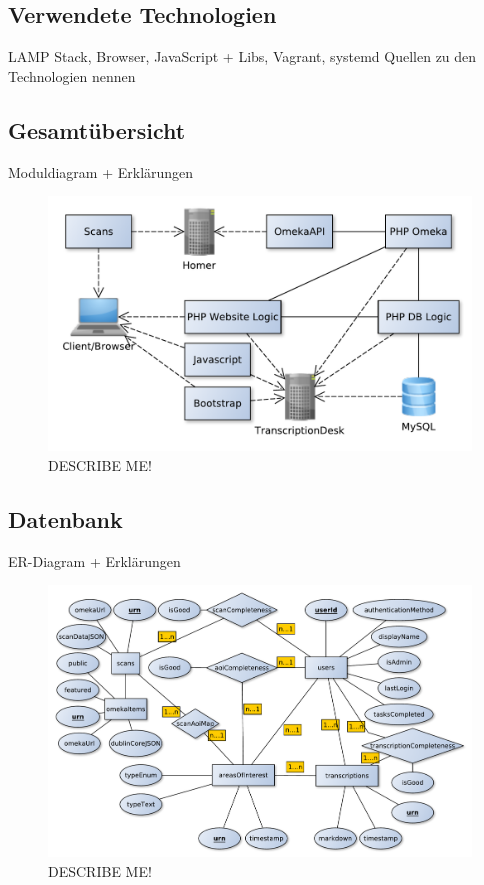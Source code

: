 \documentclass{article}
\begin{document}
\subsection{Verwendete Technologien}
LAMP Stack, Browser, JavaScript + Libs, Vagrant, systemd
Quellen zu den Technologien nennen

\subsection{Gesamtübersicht}
Moduldiagram + Erklärungen
\\\begin{figure}
\includegraphics[width=\textwidth]{../notes/components.pdf}
\caption{DESCRIBE ME!}
\label{fig:components}
\end{figure}

\subsection{Datenbank}
ER-Diagram + Erklärungen
\\\begin{figure}
\includegraphics[width=\textwidth]{../notes/ER.pdf}
\caption{DESCRIBE ME!}
\label{fig:er}
\end{figure}
\end{document}
